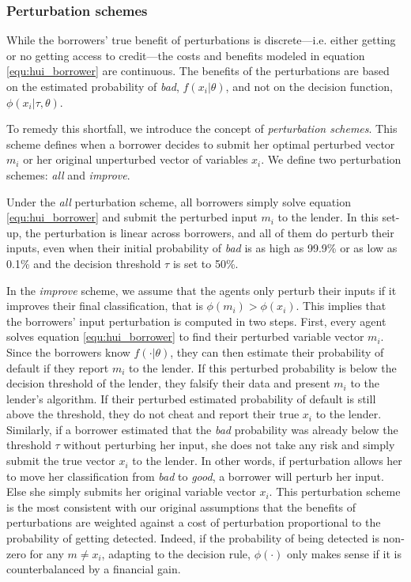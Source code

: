 \documentclass[12pt]{article} %
\begin{document}
\subsubsection{Perturbation schemes}
\label{sec:pert_schemes}
While the borrowers' true benefit of perturbations is discrete---i.e. either getting or no getting access to credit---the costs and benefits modeled in equation \eqref{equ:hui_borrower} are continuous. The benefits of the perturbations are based on the estimated probability of \textit{bad}, $f(x_i | \theta)$, and not on the decision function, $\phi(x_i|\tau, \theta)$. 

To remedy this shortfall, we introduce the concept of \textit{perturbation schemes}. This scheme defines when a borrower decides to submit her optimal perturbed vector $m_i$ or her original unperturbed vector of variables $x_i$. We define two perturbation schemes: \textit{all} and \textit{improve}. 

Under the \textit{all} perturbation scheme, all borrowers simply solve equation \eqref{equ:hui_borrower} and submit the perturbed input $m_i$ to the lender. In this set-up, the perturbation is linear across borrowers, and all of them do perturb their inputs, even when their initial probability of \textit{bad} is as high as 99.9\% or as low as 0.1\% and the decision threshold $\tau$ is set to 50\%.  

In the \textit{improve} scheme, we assume that the agents only perturb their inputs if it improves their final classification, that is $\phi(m_i)>\phi(x_i)$. This implies that the borrowers' input perturbation is computed in two steps. First, every agent solves equation \eqref{equ:hui_borrower} to find their perturbed variable vector $m_i$. Since the borrowers know $f(\cdot|\theta)$, they can then estimate their probability of default if they report $m_i$ to the lender. 
If this perturbed probability is below the decision threshold of the lender, they falsify their data and present $m_i$ to the lender's algorithm. 
If their perturbed estimated probability of default is still above the threshold, they do not cheat and report their true $x_i$ to the lender. 
Similarly, if a borrower estimated that the \textit{bad} probability was already below the threshold $\tau$ without perturbing her input, she does not take any risk and simply submit the true vector $x_i$ to the lender. 
In other words, if perturbation allows her to move her classification from \textit{bad} to \textit{good}, a borrower will perturb her input. Else she simply submits her original variable vector $x_i$. This perturbation scheme is the most consistent with our original assumptions that the benefits of perturbations are weighted against a cost of perturbation proportional to the probability of getting detected. Indeed, if the probability of being detected is non-zero for any $m \neq x_i$, adapting to the decision rule, $\phi(\cdot)$ only makes sense if it is counterbalanced by a financial gain. 
\end{document}
